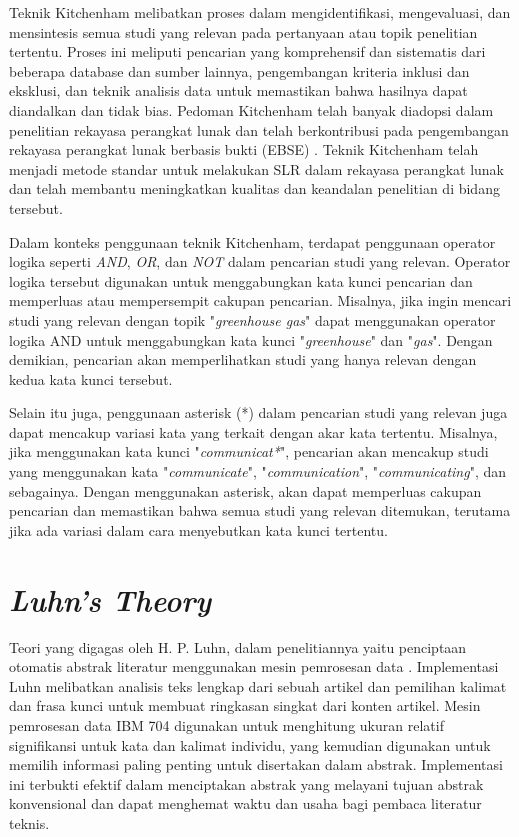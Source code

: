 \vspace{1.5cm}
Teknik Kitchenham melibatkan proses dalam mengidentifikasi, mengevaluasi, dan mensintesis semua studi yang relevan pada pertanyaan atau topik penelitian tertentu. Proses ini meliputi pencarian yang komprehensif dan sistematis dari beberapa database dan sumber lainnya, pengembangan kriteria inklusi dan eksklusi, dan teknik analisis data untuk memastikan bahwa hasilnya dapat diandalkan dan tidak bias. Pedoman Kitchenham telah banyak diadopsi dalam penelitian rekayasa perangkat lunak dan telah berkontribusi pada pengembangan rekayasa perangkat lunak berbasis bukti (EBSE) \cite{kitchenham_systematic_2009, PIZARD2023107101}. Teknik Kitchenham telah menjadi metode standar untuk melakukan SLR dalam rekayasa perangkat lunak dan telah membantu meningkatkan kualitas dan keandalan penelitian di bidang tersebut.

Dalam konteks penggunaan teknik Kitchenham, terdapat penggunaan operator logika seperti \textit{AND}, \textit{OR}, dan \textit{NOT} dalam pencarian studi yang relevan. Operator logika tersebut digunakan untuk menggabungkan kata kunci pencarian dan memperluas atau mempersempit cakupan pencarian. Misalnya, jika ingin mencari studi yang relevan dengan topik "\textit{greenhouse gas}" dapat menggunakan operator logika AND untuk menggabungkan kata kunci "\textit{greenhouse}" dan "\textit{gas}". Dengan demikian, pencarian akan memperlihatkan studi yang hanya relevan dengan kedua kata kunci tersebut. 

Selain itu juga, penggunaan asterisk (*) dalam pencarian studi yang relevan juga dapat mencakup variasi kata yang terkait dengan akar kata tertentu. Misalnya, jika menggunakan kata kunci "\textit{communicat*}", pencarian akan mencakup studi yang menggunakan kata "\textit{communicate}", "\textit{communication}", "\textit{communicating}", dan sebagainya. Dengan menggunakan asterisk, akan dapat memperluas cakupan pencarian dan memastikan bahwa semua studi yang relevan ditemukan, terutama jika ada variasi dalam cara menyebutkan kata kunci tertentu.

\section{\textit{Luhn's Theory}}

Teori yang digagas oleh H. P. Luhn, dalam penelitiannya yaitu penciptaan otomatis abstrak literatur menggunakan mesin pemrosesan data \cite{luhn_automatic_1958}. Implementasi Luhn melibatkan analisis teks lengkap dari sebuah artikel dan pemilihan kalimat dan frasa kunci untuk membuat ringkasan singkat dari konten artikel. Mesin pemrosesan data IBM 704 digunakan untuk menghitung ukuran relatif signifikansi untuk kata dan kalimat individu, yang kemudian digunakan untuk memilih informasi paling penting untuk disertakan dalam abstrak. Implementasi ini terbukti efektif dalam menciptakan abstrak yang melayani tujuan abstrak konvensional dan dapat menghemat waktu dan usaha bagi pembaca literatur teknis.

